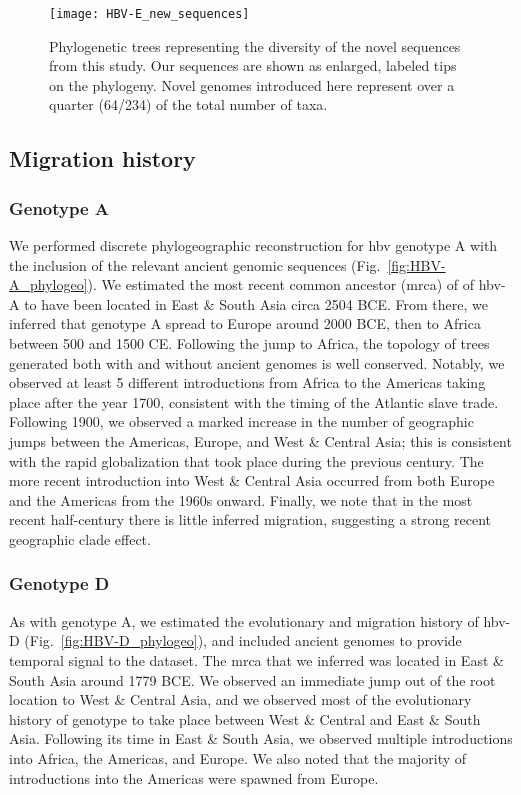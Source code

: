 \begin{figure}[ht]
  \centering
  \medskip
  \texttt{[image: HBV-E\_new\_sequences]}
  \caption[HBV-E New sequences]{Phylogenetic trees representing the diversity of the novel sequences from this study. Our sequences are shown as enlarged, labeled tips on the phylogeny. Novel genomes introduced here represent over a quarter (64/234) of the total number of taxa.}
  \label{fig:HBV-E_new_sequences}
\end{figure}

\subsection{Migration history}

\subsubsection{Genotype A}

We performed discrete phylogeographic reconstruction for \gls{hbv} genotype A with the inclusion of the relevant ancient genomic sequences (Fig.~\ref{fig:HBV-A_phylogeo}).
We estimated the most recent common ancestor (\gls{mrca}) of of \gls{hbv}-A to have been located in East \& South Asia circa 2504 BCE.
From there, we inferred that genotype A spread to Europe around 2000 BCE, then to Africa between 500 and 1500 CE.
Following the jump to Africa, the topology of trees generated both with and without ancient genomes is well conserved.
Notably, we observed at least 5 different introductions from Africa to the Americas taking place after the year 1700, consistent with the timing of the Atlantic slave trade.
Following 1900, we observed a marked increase in the number of geographic jumps between the Americas, Europe, and West \& Central Asia; this is consistent with the rapid globalization that took place during the previous century.
The more recent introduction into West \& Central Asia occurred from both Europe and the Americas from the 1960s onward.
Finally, we note that in the most recent half-century there is little inferred migration, suggesting a strong recent geographic clade effect.

\subsubsection{Genotype D}

As with genotype A, we estimated the evolutionary and migration history of \gls{hbv}-D (Fig.~\ref{fig:HBV-D_phylogeo}), and included ancient genomes to provide temporal signal to the dataset.
The \gls{mrca} that we inferred was located in East \& South Asia around 1779 BCE.
We observed an immediate jump out of the root location to West \& Central Asia, and we observed most of the evolutionary history of genotype to take place between West \& Central and East \& South Asia.
Following its time in East \& South Asia, we observed multiple introductions into Africa, the Americas, and Europe.
We also noted that the majority of introductions into the Americas were spawned from Europe.

